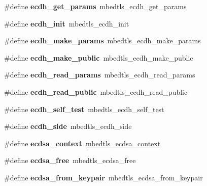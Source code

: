 \begin{DoxyCompactItemize}
\#define {\bfseries ecdh\+\_\+get\+\_\+params}~mbedtls\+\_\+ecdh\+\_\+get\+\_\+params
\item 
\mbox{\label{compat-1_83_8h_a11517f4e7c635269211257451bfe36e1}} 
\#define {\bfseries ecdh\+\_\+init}~mbedtls\+\_\+ecdh\+\_\+init
\item 
\mbox{\label{compat-1_83_8h_a4359d60d79e37303e5f7efaee296dcd4}} 
\#define {\bfseries ecdh\+\_\+make\+\_\+params}~mbedtls\+\_\+ecdh\+\_\+make\+\_\+params
\item 
\mbox{\label{compat-1_83_8h_a8d824383a497cafad415facc16ad6dc7}} 
\#define {\bfseries ecdh\+\_\+make\+\_\+public}~mbedtls\+\_\+ecdh\+\_\+make\+\_\+public
\item 
\mbox{\label{compat-1_83_8h_a1052d06393481c61c19e62e19f0b2260}} 
\#define {\bfseries ecdh\+\_\+read\+\_\+params}~mbedtls\+\_\+ecdh\+\_\+read\+\_\+params
\item 
\mbox{\label{compat-1_83_8h_a2f7e60281e99eb5f0377614c1acb1b1d}} 
\#define {\bfseries ecdh\+\_\+read\+\_\+public}~mbedtls\+\_\+ecdh\+\_\+read\+\_\+public
\item 
\mbox{\label{compat-1_83_8h_a1fd1aa9b4c0bc9cbf99bef8484624144}} 
\#define {\bfseries ecdh\+\_\+self\+\_\+test}~mbedtls\+\_\+ecdh\+\_\+self\+\_\+test
\item 
\mbox{\label{compat-1_83_8h_a86adb79cf567e9e5d6ad27336e598a31}} 
\#define {\bfseries ecdh\+\_\+side}~mbedtls\+\_\+ecdh\+\_\+side
\item 
\mbox{\label{compat-1_83_8h_a4e8a6b236724a3639613342f873da048}} 
\#define {\bfseries ecdsa\+\_\+context}~\mbox{\hyperlink{structmbedtls__ecp__keypair}{mbedtls\+\_\+ecdsa\+\_\+context}}
\item 
\mbox{\label{compat-1_83_8h_a063d0a32d1dde6268c44d36c92819b36}} 
\#define {\bfseries ecdsa\+\_\+free}~mbedtls\+\_\+ecdsa\+\_\+free
\item 
\mbox{\label{compat-1_83_8h_a0f0e05776d34f3190858eaf30cd06792}} 
\#define {\bfseries ecdsa\+\_\+from\+\_\+keypair}~mbedtls\+\_\+ecdsa\+\_\+from\+\_\+keypair

\end{DoxyCompactItemize}
